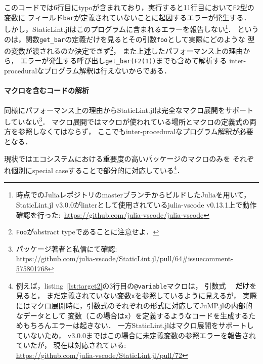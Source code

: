 このコードでは6行目にtypoが含まれており，実行すると11行目において\verb|F2|型の変数に
フィールド\verb|bar|が定義されていないことに起因するエラーが発生する．
しかし，StaticLint.jlはこのプログラムに含まれるエラーを報告しない\footnote{
  \date{\today}時点でのJuliaレポジトリのmasterブランチからビルドしたJuliaを用いて，
  StaticLint.jl v3.0.0がlinterとして使用されているjulia-vscode v0.13.1上で動作確認を行った:\
  \url{https://github.com/julia-vscode/julia-vscode}
}．
というのは，関数\verb|get_bar|の定義だけを見るとその引数\verb|foo|として実際にどのような
型の変数が渡されるのか決定できず\footnote{
  \texttt{Foo}がabstract typeであることに注意せよ．
}，
また上述したパフォーマンス上の理由から，
エラーが発生する呼び出し\verb|get_bar(F2(1))|までも含めて解析する
inter-proceduralなプログラム解釈は行えないからである．

\paragraph{マクロを含むコードの解析} \label{paragraph:analyse-code-including-macro}

同様にパフォーマンス上の理由からStaticLint.jlは完全なマクロ展開をサポートしていない\footnote{
  パッケージ著者と私信にて確認:\\
  \url{https://github.com/julia-vscode/StaticLint.jl/pull/64\#issuecomment-575801768}
}．
マクロ展開ではマクロが使われている場所とマクロの定義式の両方を参照しなくてはならず，
ここでもinter-proceduralなプログラム解釈が必要となる．

現状ではエコシステムにおける重要度の高いパッケージのマクロのみを
それぞれ個別にspecial caseすることで部分的に対応している\footnote{
  例えば，listing~\ref{lst:target2}の3行目の\texttt{@variable}マクロは，
  引数式　 \textbf{だけ}を見ると，
  まだ定義されていない変数\texttt{x}を参照しているように見えるが，
  実際にはマクロ展開時に，引数式のそれぞれの形式に対応してJuMP.jlの内部的なデータとして
  変数（この場合は\texttt{x}）を定義するようなコードを生成するためもちろんエラーは起きない．
  一方StaticLint.jlはマクロ展開をサポートしていないため，
  v3.0.0まではこの場合に未定義変数の参照エラーを報告されていたが，
  現在は対応されている:\\
  \url{https://github.com/julia-vscode/StaticLint.jl/pull/72}
}．
